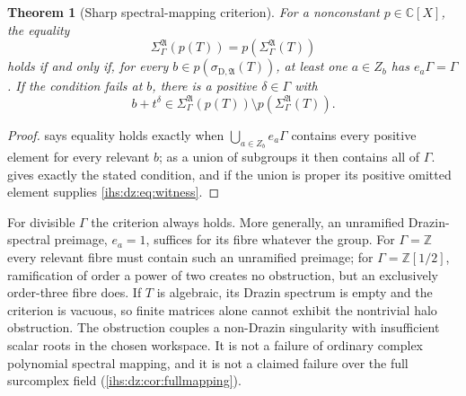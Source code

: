 \documentclass[11pt,a4paper]{article}
\numberwithin{equation}{section}
\newtheorem{theorem}{Theorem}[section]
\theoremstyle{definition}
\theoremstyle{remark}
\newcommand{\C}{\mathbb C}
\newcommand{\Z}{\mathbb Z}
\newcommand{\Alg}{\mathfrak A}
\newcommand{\SigA}{\Sigma^{\Alg}_\Gamma}
\newcommand{\sigD}{\sigma_{\mathrm D,\Alg}}
\begin{document}
\begin{theorem}[Sharp spectral-mapping criterion]\label{ihs:dz:thm:criterion}
For a nonconstant $p\in\C[X]$, the equality
\begin{equation}\label{ihs:dz:eq:criterion}
 \SigA(p(T))=p(\SigA(T))
\end{equation}
holds if and only if, for every $b\in p(\sigD(T))$, at least one $a\in Z_b$
has $e_a\Gamma=\Gamma$. If the condition fails at $b$, there is a positive
$\delta\in\Gamma$ with
\begin{equation}\label{ihs:dz:eq:witness}
 b+t^\delta\in\SigA(p(T))\setminus p(\SigA(T)).
\end{equation}
\end{theorem}
\begin{proof}
 says equality holds exactly when
$\bigcup_{a\in Z_b}e_a\Gamma$ contains every positive element for every
relevant $b$; as a union of subgroups it then contains all of $\Gamma$.
 gives exactly the stated condition, and if the union
is proper its positive omitted element supplies \eqref{ihs:dz:eq:witness}.
\end{proof}

For divisible $\Gamma$ the criterion always holds. More generally, an
unramified Drazin-spectral preimage, $e_a=1$, suffices for its fibre whatever
the group. For $\Gamma=\Z$ every relevant fibre must contain such an
unramified preimage; for $\Gamma=\Z[1/2]$, ramification of order a power of
two creates no obstruction, but an exclusively order-three fibre does. If $T$
is algebraic, its Drazin spectrum is empty and the criterion is vacuous, so
finite matrices alone cannot exhibit the nontrivial halo obstruction. The
obstruction couples a non-Drazin singularity with insufficient scalar roots
in the chosen workspace. It is not a failure of ordinary complex polynomial
spectral mapping, and it is not a claimed failure over the full surcomplex
field (\cref{ihs:dz:cor:fullmapping}).
\end{document}
